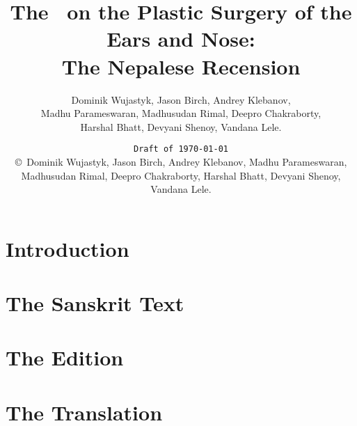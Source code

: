 \documentclass[12pt,draft]{article} %
\title{The \SS\ on the Plastic Surgery of the Ears and Nose:\\ The Nepalese 
Recension}
\author{Dominik Wujastyk, 
Jason Birch,
Andrey Klebanov, \\
Madhu Parameswaran,
Madhusudan Rimal, 
Deepro Chakraborty,\\
Harshal Bhatt, 
Devyani Shenoy,
Vandana Lele.}
\date{\texttt{Draft of \today}\\ \copyright\     \small{Dominik Wujastyk, 
Jason Birch,
Andrey Klebanov, 
Madhu Parameswaran,
Madhusudan Rimal, 
Deepro Chakraborty,
Harshal Bhatt, 
Devyani Shenoy,
Vandana Lele.}}
\begin{document}
 
    
    
    \pagecolor{cyan}
  
    \maketitle
    \pagecolor{white}
%     
    \tableofcontents
\newpage
    \section{Introduction}
    \section{The Sanskrit Text}
%
    \section{The Edition}
\newpage
    \section{The Translation}
\newpage
%    
    
    
\end{document}
